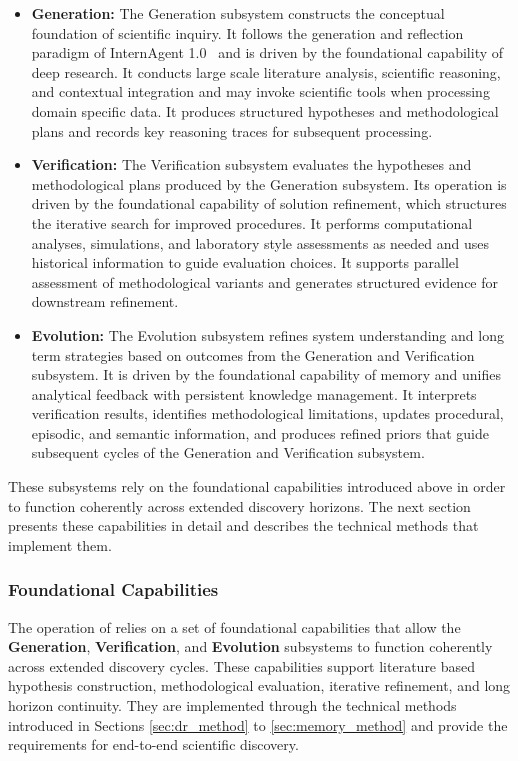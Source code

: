 \begin{itemize}
    \item \textbf{Generation:} The Generation subsystem constructs the conceptual foundation of scientific inquiry. It follows the generation and reflection paradigm of InternAgent 1.0~\citep{team2025novelseek} and is driven by the foundational capability of deep research. It conducts large scale literature analysis, scientific reasoning, and contextual integration and may invoke scientific tools when processing domain specific data. It produces structured hypotheses and methodological plans and records key reasoning traces for subsequent processing.

    \item \textbf{Verification:} The Verification subsystem evaluates the hypotheses and methodological plans produced by the Generation subsystem. Its operation is driven by the foundational capability of solution refinement, which structures the iterative search for improved procedures. It performs computational analyses, simulations, and laboratory style assessments as needed and uses historical information to guide evaluation choices. It supports parallel assessment of methodological variants and generates structured evidence for downstream refinement.

    \item \textbf{Evolution:} The Evolution subsystem refines system understanding and long term strategies based on outcomes from the Generation and Verification subsystem. It is driven by the foundational capability of memory and unifies analytical feedback with persistent knowledge management. It interprets verification results, identifies methodological limitations, updates procedural, episodic, and semantic information, and produces refined priors that guide subsequent cycles of the Generation and Verification subsystem.
\end{itemize}

These subsystems rely on the foundational capabilities introduced above in order to function coherently across extended discovery horizons. The next section presents these capabilities in detail and describes the technical methods that implement them.


\subsubsection{Foundational Capabilities}

The operation of {\ProjectName} relies on a set of foundational capabilities that allow the \textbf{Generation}, \textbf{Verification}, and \textbf{Evolution} subsystems to function coherently across extended discovery cycles. These capabilities support literature based hypothesis construction, methodological evaluation, iterative refinement, and long horizon continuity. They are implemented through the technical methods introduced in Sections \ref{sec:dr_method} to \ref{sec:memory_method} and provide the requirements for end-to-end scientific discovery.

